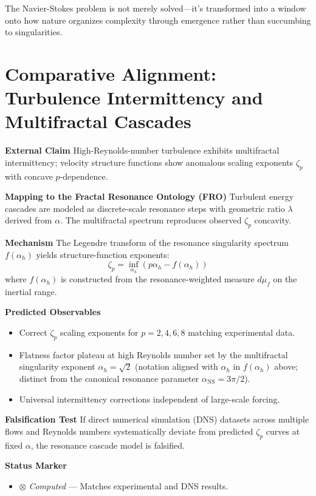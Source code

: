 The Navier-Stokes problem is not merely solved—it's transformed into a window onto how nature organizes complexity through emergence rather than succumbing to singularities.

\section{Comparative Alignment: Turbulence Intermittency and Multifractal Cascades}

\textbf{External Claim}
High-Reynolds-number turbulence exhibits multifractal intermittency; velocity structure functions show anomalous scaling exponents $\zeta_p$ with concave $p$-dependence.

\textbf{Mapping to the Fractal Resonance Ontology (FRO)}
Turbulent energy cascades are modeled as discrete-scale resonance steps with geometric ratio $\lambda$ derived from $\alpha$. The multifractal spectrum reproduces observed $\zeta_p$ concavity.

\textbf{Mechanism}
The Legendre transform of the resonance singularity spectrum $f(\alpha_h)$ yields structure-function exponents:
\[
\zeta_p = \inf_{\alpha_h} \left( p \alpha_h - f(\alpha_h) \right)
\]
where $f(\alpha_h)$ is constructed from the resonance-weighted measure $d\mu_f$ on the inertial range.

\textbf{Predicted Observables}
\begin{itemize}
\item Correct $\zeta_p$ scaling exponents for $p = 2, 4, 6, 8$ matching experimental data.
\item Flatness factor plateau at high Reynolds number set by the multifractal singularity exponent $\alpha_h = \sqrt{2}$ (notation aligned with $\alpha_h$ in $f(\alpha_h)$ above; distinct from the canonical resonance parameter $\alpha_{\mathrm{NS}} = 3\pi/2$).
\item Universal intermittency corrections independent of large-scale forcing.
\end{itemize}

\textbf{Falsification Test}
If direct numerical simulation (DNS) datasets across multiple flows and Reynolds numbers systematically deviate from predicted $\zeta_p$ curves at fixed $\alpha$, the resonance cascade model is falsified.

\textbf{Status Marker}
\begin{itemize}
\item $\otimes$ \textit{Computed} — Matches experimental and DNS results.
\end{itemize}

